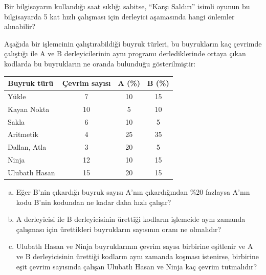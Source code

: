 \begin{alistirma}[\kolay]
Bir bilgisayarın kullandığı saat sıklığı sabitse, ``Karşı Saldırı'' isimli oyunun bu bilgisayarda 5 kat hızlı çalışması için derleyici aşamasında hangi önlemler alınabilir?
\end{alistirma}

\begin{alistirma}[\zor]
Aşağıda bir işlemcinin çalıştırabildiği buyruk türleri, bu buyrukların kaç çevrimde çalıştığı ile A ve B derleyicilerinin aynı programı derlediklerinde ortaya çıkan kodlarda bu buyrukların ne oranda bulunduğu gösterilmiştir:

\begin{center}
\small
\begin{tabular}{lccc}
\toprule
\textbf{Buyruk türü} & \textbf{Çevrim sayısı} & \textbf{A (\%)} & \textbf{B (\%)} \\
\midrule
Yükle          &  7 & 10 & 15 \\
Kayan Nokta    & 10 &  5 & 10 \\
Sakla          &  6 & 10 &  5 \\
Aritmetik      &  4 & 25 & 35 \\
Dallan, Atla   &  3 & 20 &  5 \\
Ninja          & 12 & 10 & 15 \\
Ulubatlı Hasan & 15 & 20 & 15 \\
\bottomrule
\end{tabular}
\end{center}

\begin{enumerate}[(a)]
    \item Eğer B'nin çıkardığı buyruk sayısı A'nın çıkardığından \%20 fazlaysa A'nın kodu B'nin kodundan ne kadar daha hızlı çalışır?
    \item A derleyicisi ile B derleyicisinin ürettiği kodların işlemcide aynı zamanda çalışması için ürettikleri buyrukların sayısının oranı ne olmalıdır?
    \item Ulubatlı Hasan ve Ninja buyruklarının çevrim sayısı birbirine eşitlenir ve A ve B derleyicisinin ürettiği kodların aynı zamanda koşması istenirse, birbirine eşit çevrim sayısında çalışan Ulubatlı Hasan ve Ninja kaç çevrim tutmalıdır?
\end{enumerate}
\end{alistirma}
